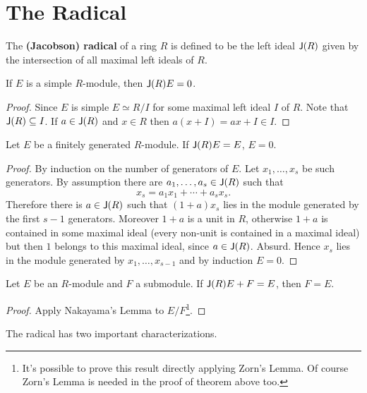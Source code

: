 \section{The Radical}
The \textbf{(Jacobson) radical} of a ring $R$ is defined to be the left ideal $\operatorname{\sf{J}}(R)$ given by the intersection of all maximal left ideals of $R$.

\begin{lem} If $E$ is a simple $R$-module, then $\operatorname{\sf{J}}(R)E=0$. 
\begin{proof}
Since $E$ is simple $E \simeq R/I$ for some maximal left ideal $I$ of $R$. 
Note that $\operatorname{\sf{J}}(R) \subseteq I$. If $a \in \operatorname{\sf{J}}(R)$ and $x \in R$ then $a(x+I)=ax + I \in I$.
\end{proof}
\end{lem} 

\begin{thm} Let $E$ be a finitely generated $R$-module. 
If $\operatorname{\sf{J}}(R)E =E$, $E =0$. 
\begin{proof} 
By induction on the number of generators of $E$. 
Let $x_1, \ldots, x_s$ be such generators.
By assumption there are $a_1, \ldots, a_s \in \operatorname{\sf{J}}(R)$ such that 
$$x_s=a_1 x_1 + \cdots + a_s x_s \text{.}$$
Therefore there is $a \in \operatorname{\sf{J}}(R)$ such that $(1+a)x_s$ lies in the module generated by the first $s-1$ generators. 
Moreover $1+a$ is a unit in $R$, otherwise $1+a$ is contained in some maximal ideal (every non-unit is contained in a maximal ideal) but then $1$ belongs to this maximal ideal, since $a \in \operatorname{\sf{J}}(R)$.
Absurd. 
Hence $x_s$ lies in the module generated by $x_1, \ldots, x_{s-1}$ and by induction $E=0$. 
\end{proof}
\end{thm}

\begin{cor}
\label{naka_cor}
Let $E$ be an $R$-module and $F$ a submodule. If $\operatorname{\sf{J}}(R)E+F=E$, then $F=E$. 
\begin{proof}
Apply Nakayama's Lemma to $E/F$\footnote{It's possible to prove this result directly applying Zorn's Lemma. Of course Zorn's Lemma is needed in the proof of theorem above too.}.
\end{proof}
\end{cor}

The radical has two important characterizations. 

